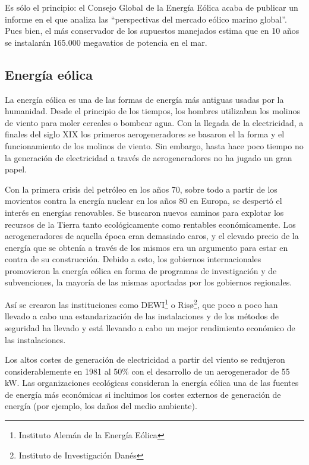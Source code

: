 \documentclass[12pt,letterpaper,superscriptaddress]{article}
\begin{document}
Es sólo el principio: el Consejo Global de la Energía Eólica acaba de publicar un informe en el que analiza las “perspectivas del mercado eólico marino global”. Pues bien, el más conservador de los supuestos manejados estima que en 10 años se instalarán 165.000 megavatios de potencia en el mar.

\clearpage

\subsection{Energía eólica}

La energía eólica es una de las formas de energía más antiguas usadas por la humanidad. Desde el principio de los tiempos, los hombres utilizaban los molinos de viento para moler cereales o bombear agua. Con la llegada de la electricidad, a finales del siglo XIX los primeros aerogeneradores se basaron el la forma y el funcionamiento de los molinos de viento. Sin embargo, hasta hace poco tiempo no la generación de electricidad a través de aerogeneradores no ha jugado un gran papel.

Con la primera crisis del petróleo en los años 70, sobre todo a partir de los movientos contra la energía nuclear en los años 80 en Europa, se despertó el interés en energías renovables. Se buscaron nuevos caminos para explotar los recursos de la Tierra tanto ecológicamente como rentables económicamente. Los aerogeneradores de aquella época eran demasiado caros, y el elevado precio de la energía que se obtenía a través de los mismos era un argumento para estar en contra de su construcción. Debido a esto, los gobiernos internacionales promovieron la energía eólica en forma de programas de investigación y de subvenciones, la mayoría de las mismas aportadas por los gobiernos regionales.

Así se crearon las instituciones como DEWI\footnote{Instituto Alemán de la Energía Eólica} o Risø\footnote{Instituto de Investigación Danés}, que poco a poco han llevado a cabo una estandarización de las instalaciones y de los métodos de seguridad ha llevado y está llevando a cabo un mejor rendimiento económico de las instalaciones.

Los altos costes de generación de electricidad a partir del viento se redujeron considerablemente en 1981 al 50\% con el desarrollo de un aerogenerador de 55 kW. Las organizaciones ecológicas consideran la energía eólica una de las fuentes de energía más económicas si incluimos los costes externos de generación de energía (por ejemplo, los daños del medio ambiente).
\end{document}
